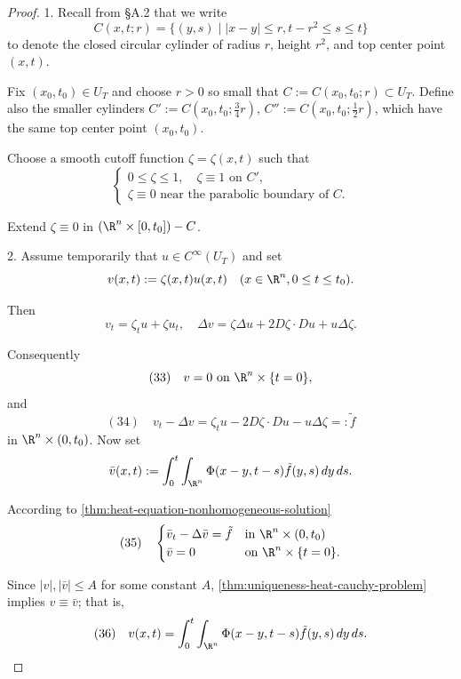 \begin{proof}
1. Recall from \S A.2 that we write
$$C(x,t;r) = \{(y,s) \mid |x - y| \leq r, t - r^2 \leq s \leq t\}$$
to denote the closed circular cylinder of radius $r$, height $r^2$, and top center point $(x,t)$.

Fix $(x_0, t_0) \in U_T$ and choose $r > 0$ so small that $C := C(x_0, t_0; r) \subset U_T$. Define also the smaller cylinders $C' := C(x_0, t_0; \frac{3}{4}r)$, $C'' := C(x_0, t_0; \frac{1}{2}r)$, which have the same top center point $(x_0, t_0)$.

Choose a smooth cutoff function $\zeta = \zeta(x,t)$ such that
$$\begin{cases} 0 \leq \zeta \leq 1, \quad \zeta \equiv 1 \text{ on } C', \\ \zeta \equiv 0 \text{ near the parabolic boundary of } C. \end{cases}$$

Extend $\zeta \equiv 0$ in $(\R^n \times [0, t_0]) - C$.

\begin{figure}[h]\centering
\end{figure}

2. Assume temporarily that $u \in C^\infty(U_T)$ and set
$$v(x,t) := \zeta(x,t)u(x,t) \quad (x \in \R^n, 0 \leq t \leq t_0).$$

Then
$$v_t = \zeta_t u + \zeta u_t, \quad \Delta v = \zeta \Delta u + 2D\zeta \cdot Du + u\Delta\zeta.$$

Consequently
$$(33) \quad v = 0 \text{ on } \R^n \times \{t = 0\},$$
and
$$(34) \quad v_t - \Delta v = \zeta_t u - 2D\zeta \cdot Du - u\Delta\zeta =: \tilde{f}$$
in $\R^n \times (0, t_0)$. Now set
$$\bar{v}(x,t) := \int_0^t \int_{\R^n} \Phi(x-y, t-s)\tilde{f}(y,s) \, dy\,ds.$$

According to \cref{thm:heat-equation-nonhomogeneous-solution}
$$(35) \quad \begin{cases}
\bar{v}_t - \Delta \bar{v} = \tilde{f} & \text{in } \R^n \times (0, t_0) \\
\bar{v} = 0 & \text{on } \R^n \times \{t = 0\}.
\end{cases}$$

Since $|v|, |\bar{v}| \leq A$ for some constant $A$, \cref{thm:uniqueness-heat-cauchy-problem} implies $v \equiv \bar{v}$; that is,
$$(36) \quad v(x,t) = \int_0^t \int_{\R^n} \Phi(x-y, t-s)\tilde{f}(y,s) \, dy\,ds.$$


\end{proof}
